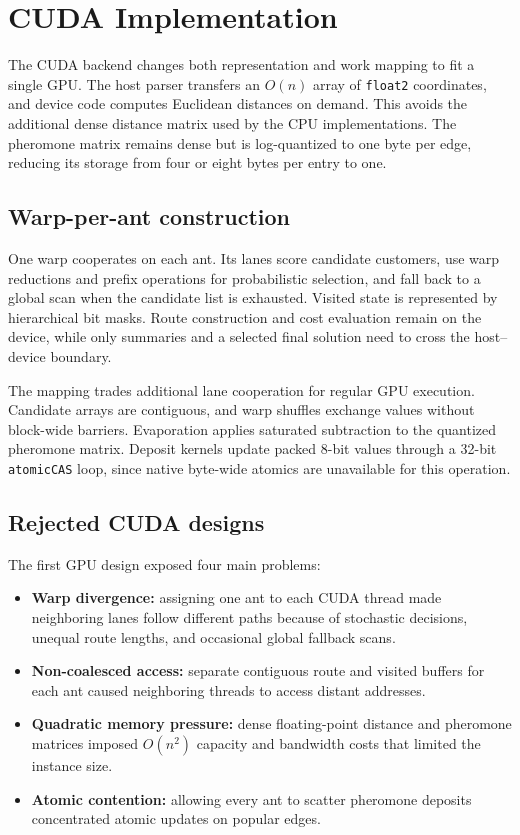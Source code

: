 \section{CUDA Implementation}

The CUDA backend changes both representation and work mapping to fit a single GPU.  The host parser transfers an $O(n)$ array of \texttt{float2} coordinates, and device code computes Euclidean distances on demand.  This avoids the additional dense distance matrix used by the CPU implementations.  The pheromone matrix remains dense but is log-quantized to one byte per edge, reducing its storage from four or eight bytes per entry to one.

\subsection{Warp-per-ant construction}

One warp cooperates on each ant.  Its lanes score candidate customers, use warp reductions and prefix operations for probabilistic selection, and fall back to a global scan when the candidate list is exhausted.  Visited state is represented by hierarchical bit masks.  Route construction and cost evaluation remain on the device, while only summaries and a selected final solution need to cross the host--device boundary.

The mapping trades additional lane cooperation for regular GPU execution.  Candidate arrays are contiguous, and warp shuffles exchange values without block-wide barriers.  Evaporation applies saturated subtraction to the quantized pheromone matrix.  Deposit kernels update packed 8-bit values through a 32-bit \texttt{atomicCAS} loop, since native byte-wide atomics are unavailable for this operation.

\subsection{Rejected CUDA designs}

The first GPU design exposed four main problems:
\begin{itemize}[leftmargin=*,nosep]
    \item \textbf{Warp divergence:} assigning one ant to each CUDA thread made neighboring lanes follow different paths because of stochastic decisions, unequal route lengths, and occasional global fallback scans.
    \item \textbf{Non-coalesced access:} separate contiguous route and visited buffers for each ant caused neighboring threads to access distant addresses.
    \item \textbf{Quadratic memory pressure:} dense floating-point distance and pheromone matrices imposed $O(n^2)$ capacity and bandwidth costs that limited the instance size.
    \item \textbf{Atomic contention:} allowing every ant to scatter pheromone deposits concentrated atomic updates on popular edges.
\end{itemize}

